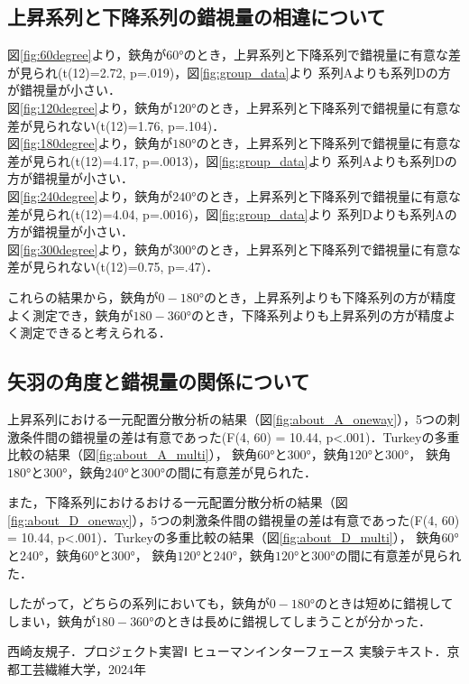 \documentclass{jlreq}
\numberwithin{equation}{section}
\begin{document}
\subsection{上昇系列と下降系列の錯視量の相違について}
図\ref{fig:60degree}より，鋏角が$60\si{\degree}$のとき，上昇系列と下降系列で錯視量に有意な差が見られ(t(12)=2.72, p=.019)，図\ref{fig:group_data}より
系列Aよりも系列Dの方が錯視量が小さい．\\
図\ref{fig:120degree}より，鋏角が$120\si{\degree}$のとき，上昇系列と下降系列で錯視量に有意な差が見られない(t(12)=1.76, p=.104)．\\
図\ref{fig:180degree}より，鋏角が$180\si{\degree}$のとき，上昇系列と下降系列で錯視量に有意な差が見られ(t(12)=4.17, p=.0013)，図\ref{fig:group_data}より
系列Aよりも系列Dの方が錯視量が小さい．\\
図\ref{fig:240degree}より，鋏角が$240\si{\degree}$のとき，上昇系列と下降系列で錯視量に有意な差が見られ(t(12)=4.04, p=.0016)，図\ref{fig:group_data}より
系列Dよりも系列Aの方が錯視量が小さい．\\
図\ref{fig:300degree}より，鋏角が$300\si{\degree}$のとき，上昇系列と下降系列で錯視量に有意な差が見られない(t(12)=0.75, p=.47)．

これらの結果から，鋏角が$0-180\si{\degree}$のとき，上昇系列よりも下降系列の方が精度よく測定でき，鋏角が$180-360\si{\degree}$のとき，下降系列よりも上昇系列の方が精度よく測定できると考えられる．

\subsection{矢羽の角度と錯視量の関係について}
上昇系列における一元配置分散分析の結果（図\ref{fig:about_A_oneway}），5つの刺激条件間の錯視量の差は有意であった(F(4, 60) = 10.44, p<.001)．Turkeyの多重比較の結果（図\ref{fig:about_A_multi}），
鋏角$60\si{\degree}$と$300\si{\degree}$，鋏角$120\si{\degree}$と$300\si{\degree}$，
鋏角$180\si{\degree}$と$300\si{\degree}$，鋏角$240\si{\degree}$と$300\si{\degree}$の間に有意差が見られた．

また，下降系列におけるおける一元配置分散分析の結果（図\ref{fig:about_D_oneway}），5つの刺激条件間の錯視量の差は有意であった(F(4, 60) = 10.44, p<.001)．Turkeyの多重比較の結果（図\ref{fig:about_D_multi}），
鋏角$60\si{\degree}$と$240\si{\degree}$，鋏角$60\si{\degree}$と$300\si{\degree}$，
鋏角$120\si{\degree}$と$240\si{\degree}$，鋏角$120\si{\degree}$と$300\si{\degree}$の間に有意差が見られた．

したがって，どちらの系列においても，鋏角が$0-180\si{\degree}$のときは短めに錯視してしまい，鋏角が$180-360\si{\degree}$のときは長めに錯視してしまうことが分かった．

\begin{thebibliography}{9}
  \item 西崎友規子．プロジェクト実習Ⅰ ヒューマンインターフェース 実験テキスト．京都工芸繊維大学，2024年
\end{thebibliography}
\end{document}
